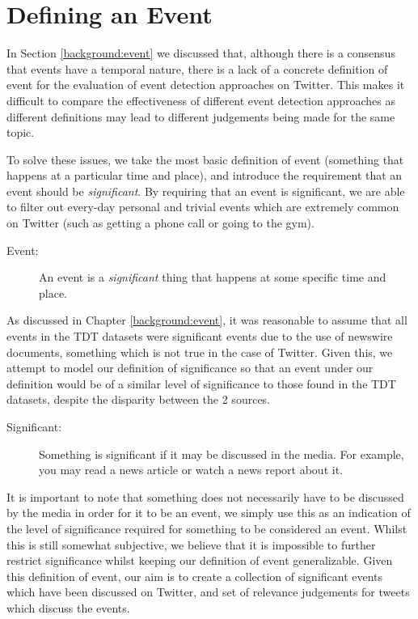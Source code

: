 
\section{Defining an Event}
\label{DefiningEvent}
In Section \ref{background:event} we discussed that, although there is a consensus that events have a temporal nature, there is a lack of a concrete definition of event for the evaluation of event detection approaches on Twitter.
This makes it difficult to compare the effectiveness of different event detection approaches as different definitions may lead to different judgements being made for the same topic.

To solve these issues, we take the most basic definition of event (something that happens at a particular time and place), and introduce the requirement that an event should be \textit{significant}.
By requiring that an event is significant, we are able to filter out every-day personal and trivial events which are extremely common on Twitter (such as getting a phone call or going to the gym).
\begin{description}
\item[Event:] An event is a \emph{significant} thing that happens at some specific time and place.
\end{description}
As discussed in Chapter \ref{background:event}, it was reasonable to assume that all events in the TDT datasets were significant events due to the use of newswire documents, something which is not true in the case of Twitter.
Given this, we attempt to model our definition of significance so that an event under our definition would be of a similar level of significance to those found in the TDT datasets, despite the disparity between the 2 sources.
\begin{description}
\item[Significant:] Something is significant if it may be discussed in the media. For example, you may read a news article or watch a news report about it.
\end{description}
It is important to note that something does not necessarily have to be discussed by the media in order for it to be an event, we simply use this as an indication of the level of significance required for something to be considered an event.
Whilst this is still somewhat subjective, we believe that it is impossible to further restrict significance whilst keeping our definition of event generalizable.
Given this definition of event, our aim is to create a collection of significant events which have been discussed on Twitter, and set of relevance judgements for tweets which discuss the events.

